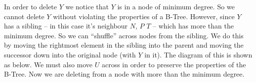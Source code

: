 \documentclass[10pt,\jkfside,a4paper]{article}
\begin{document}
\begin{enumerate}
\begin{center}
\end{center}

In order to delete $Y$ we notice that $Y$ is in a node of minimum degree. So we cannot delete $Y$ without violating 
the properties of a B-Tree. However, since $Y$ has a sibling -- in this case it's neighbour $N$, $P$ $T$ -- which has 
more than the minimum degree. So we can ``shuffle'' across nodes from the sibling. We do this by moving the rightmost 
element in the sibling into the parent and moving the successor down into the original node (with $Y$ in it). 
The diagram of this is shown as below. We must also move $U$ across in order to preserve the properties of the B-Tree.
Now we are deleting from a node with more than the minimum degree.


\end{enumerate}
\end{document}
